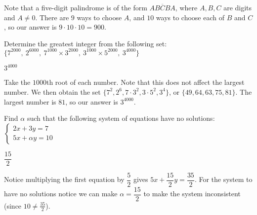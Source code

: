 \documentclass[11pt]{article}
\begin{document}
\begin{solution}
Note that a five-digit palindrome is of the form $\overline{ABCBA}$, where $A,B,C$ are digits and $A \ne 0$. There are $9$ ways to choose $A$, and $10$ ways to choose each of $B$ and $C$, so our answer is $9 \cdot 10 \cdot 10 = \boxed{900}$.
\end{solution}

\begin{problem}
Determine the greatest integer from the following set: $\{7^{2000},\  2^{6000},\ 7^{1000} \times 3^{2000},\ 3^{1000} \times 5^{2000},\ 3^{4000} \}$
\end{problem}

\begin{answer}
$\boxed{3^{4000}}$
\end{answer}

\begin{solution}
Take the $1000$th root of each number. Note that this does not affect the largest number. We then obtain the set $\{7^2, 2^6, 7 \cdot 3^2, 3 \cdot 5^2, 3^4\}$, or $\{49, 64, 63, 75, 81\}$. The largest number is $81$, so our answer is $\boxed{3^{4000}}$.
\end{solution}

\begin{problem}
Find $\alpha$ such that the following system of equations have no solutions: $\begin{cases} 2x + 3y = 7 \\ 5x + \alpha y = 10 \end{cases}$
\end{problem}

\begin{answer}
$\boxed{\dfrac{15}{2}}$
\end{answer}

\begin{solution}
Notice multiplying the first equation by $\dfrac{5}{2}$ gives $5x + \dfrac{15}{2}y = \dfrac{35}{2}$. For the system to have no solutions notice we can make $\alpha = \boxed{\dfrac{15}{2}}$ to make the system inconsistent (since $10 \ne \frac{35}{2}$). 
\end{solution}

%
%
\end{document}
